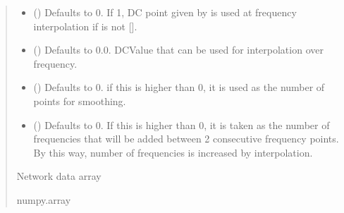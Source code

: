 \documentclass[letterpaper,10pt,english]{sphinxmanual}
\begin{document}
\begin{fulllineitems}
\begin{fulllineitems}
\begin{quote}
\begin{description}
\begin{itemize}
\item {}
\sphinxAtStartPar
{} (\sphinxstyleliteralemphasis{\sphinxupquote{, }}) \textendash{} Defaults to 0. If 1, DC point given by  is used at frequency interpolation if  is not {[}{]}.

\item {}
\sphinxAtStartPar
{} (\sphinxstyleliteralemphasis{\sphinxupquote{, }}) \textendash{} Defaults to 0.0. DCValue that can be used for interpolation over frequency.

\item {}
\sphinxAtStartPar
{} (\sphinxstyleliteralemphasis{\sphinxupquote{, }}) \textendash{} Defaults to 0. if this is higher than 0, it is used as the number of points for smoothing.

\item {}
\sphinxAtStartPar
{} (\sphinxstyleliteralemphasis{\sphinxupquote{, }}) \textendash{} Defaults to 0. If this is higher than 0, it is taken as the number of frequencies that will be added between 2 consecutive frequency points. By this way, number of frequencies is increased by interpolation.

\end{itemize}

\sphinxAtStartPar
Network data array

\sphinxAtStartPar
numpy.array

\end{description}\end{quote}

\end{fulllineitems}



\end{fulllineitems}
\end{document}

